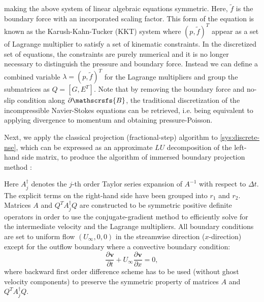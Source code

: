 \documentclass{article}
\numberwithin{equation}{section}
\begin{document}
making the above system of linear algebraic equations symmetric. 
	Here, $\tilde{f}$ is the boundary force with an incorporated scaling factor. This form of the equation is known as the Karush-Kahn-Tucker (KKT) system where $(p,\tilde{f})^T$ appear as a set of Lagrange multiplier to satisfy a set of kinematic constraints. In the discretized set of equations, the constraints are purely numerical and it is no longer necessary to distinguish the pressure and boundary force. Instead we can define a combined variable $\lambda = (p,\tilde{f})^T$ for the Lagrange multipliers and group the submatrices as $Q = [G, E^T]$. Note that by removing the boundary force and no-slip condition along $\partial \mathscrsfs{B}$, the traditional discretization of the incompressible Navier-Stokes equations can be retrieved, i.e. being equivalent to applying divergence to momentum and obtaining pressure-Poisson.

Next, we apply the classical projection (fractional-step) algorithm to \cref{sys:discrete-nse}, which can be expressed as an approximate $LU$ decomposition of the left-hand side matrix, to produce the algorithm of immersed boundary projection method \cite{Colonius:2008}:
Here $A^{\dagger}_{j}$ denotes the $j$-th order Taylor series expansion of $A^{-1}$ with respect to $\Delta t$. The explicit terms on the right-hand side have been grouped into $r_1$ and $r_2$. Matrices $A$ and $Q^TA^\dagger_jQ$ are constructed to be symmetric positive definite operators in order to use the conjugate-gradient method to efficiently solve for the intermediate velocity and the Lagrange multipliers. All boundary conditions are set to uniform flow $(U_{\infty}, 0, 0)$ in the streamwise direction ($x$-direction) except for the outflow boundary where a convective boundary condition:
\begin{equation}
  \frac{\partial\boldsymbol{v}}{\partial t} + U_\infty \frac{\partial \boldsymbol{v}}{\partial x}=0,
\end{equation}
where backward first order difference scheme has to be used (without ghost velocity components) to preserve the symmetric property of matrices $A$ and $Q^TA^\dagger_jQ$.
\end{document}
